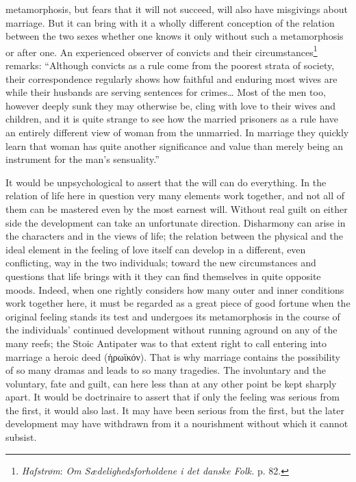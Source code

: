 \documentclass[12pt,a4paper,openany]{book}
\newcommand{\opage}[1]{\marginnote{\footnotesize\textit{[#1]}}}
\begin{document}
metamorphosis, but fears that it will not succeed, will also have misgivings about marriage. But it can bring with it a
wholly different conception of the relation between the two sexes whether one knows it only without such a metamorphosis
or after one. An experienced observer of convicts and their circumstances\footnote[2]{\emph{Hafstrøm}: \textit{Om
Sædelighedsforholdene i det danske Folk.} p. 82.} remarks: ``Although convicts as a rule come from the poorest strata
of society, their correspondence regularly shows how faithful and enduring most wives are while their husbands are
serving sentences for crimes\dots{} Most of the men too, however deeply sunk they may otherwise be, cling with love to
their wives and children, and it is quite strange to see how the married prisoners as a rule have an entirely different
view of woman from the unmarried. In marriage they quickly learn that woman has quite another significance and value
than merely being an instrument for the man's sensuality.''

It would be unpsychological to assert that the will can do everything. In the relation of life here in question very
many elements work together, and not all of them can be mastered even by the most earnest will. Without real guilt on
either side the development can take an unfortunate direction. Disharmony can arise in the characters and in the views
of life; the relation between the physical and the ideal element in the feeling of love itself can develop in a
different, even conflicting, way in the two individuals; toward the new circumstances and questions that life brings
with it they can find themselves in quite opposite moods. Indeed, when one rightly considers how many
\opage{293}outer and inner conditions work together here, it must be regarded as a great piece of good fortune when the
original feeling stands its test and undergoes its metamorphosis in the course of the individuals' continued development
without running aground on any of the many reefs; the Stoic Antipater was to that extent right to call entering into
marriage a heroic deed (ἡρωϊκόν). That is why marriage contains the possibility of so many dramas and leads to so many
tragedies. The involuntary and the voluntary, fate and guilt, can here less than at any other point be kept sharply
apart. It would be doctrinaire to assert that if only the feeling was serious from the first, it would also last. It may
have been serious from the first, but the later development may have withdrawn from it a nourishment without which it
cannot subsist.
\end{document}
